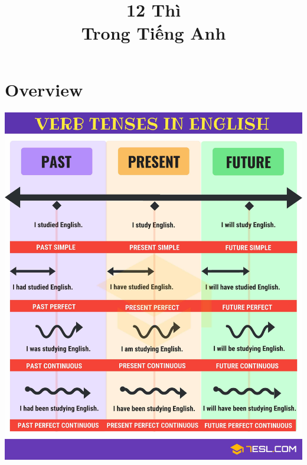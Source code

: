 \title{\Huge \textbf{12 Thì \\ Trong Tiếng Anh}}

\maketitle
\tableofcontents
\newcommand{\structure}[3]{
    \newcolbox{Structure}{
        \begin{tabular}{l|l}
            \green{(+)}&#1\\
            \red{(-)}&#2\\
            \yellow{(?)}&#3\\
        \end{tabular}
    }
}
\newcommand{\dStructure}[6]{
    \newcolbox{Structure}{
        \begin{tabular}{l|l}
            \green{(+)}&#1\\
            \red{(-)}&#2\\
            \yellow{(?)}&#3\\
            \hline
            \green{(+)}&#4\\
            \red{(-)}&#5\\
            \yellow{(?)}&#6\\
        \end{tabular}
    }
}

\chapter{Overview}
\centering
\includegraphics[width=\textwidth]{project-folders/12Tenses/englishTensesOverView.jpg} 


